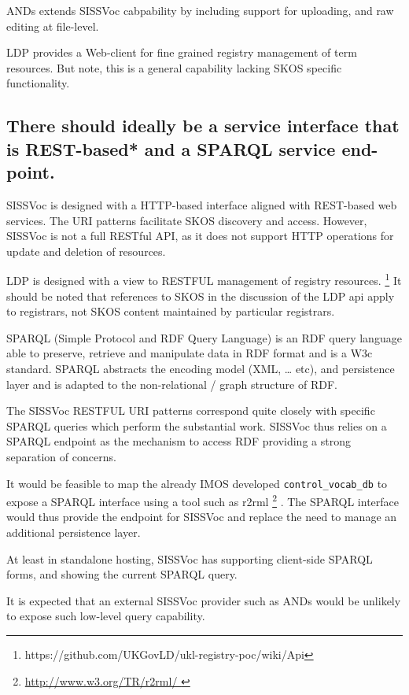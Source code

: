 \documentclass[10pt,a4paper]{article}
\begin{document}
\begin{flushleft}
  ANDs extends SISSVoc cabpability by including support for uploading, and raw editing
  at file-level. 

  LDP provides a Web-client for fine grained registry management of term
resources. But note, this is a general capability lacking SKOS specific functionality.


\subsection{ 
  There should ideally be a service interface that is REST-based* and a SPARQL service end-point.
}

    SISSVoc is designed with a HTTP-based interface aligned with REST-based web
services. The URI patterns facilitate SKOS discovery and access. However,
SISSVoc is not a full RESTful API, as it does not support HTTP operations for
update and deletion of resources.
    
    LDP is designed with a view to RESTFUL management of registry resources.
\footnote { https://github.com/UKGovLD/ukl-registry-poc/wiki/Api } It should be
noted that references to SKOS in the discussion of the LDP api apply to
registrars, not SKOS content maintained by particular registrars.  


    SPARQL (Simple Protocol and RDF Query Language) is an RDF query language
able to preserve, retrieve and manipulate data in RDF format and is a W3c
standard.  SPARQL abstracts the encoding model (XML, … etc), and persistence
layer and is adapted to the non-relational / graph structure of RDF.

    The SISSVoc RESTFUL URI patterns correspond quite closely with specific SPARQL queries
which perform the substantial work. SISSVoc thus relies on a SPARQL endpoint as the
mechanism to access RDF providing a strong separation of concerns.

    It would be feasible to map the already IMOS developed
\texttt{control\_vocab\_db} to expose a SPARQL interface using a tool such as
r2rml \footnote{ \url{ http://www.w3.org/TR/r2rml/ } } .  The SPARQL interface
would thus provide the endpoint for SISSVoc and replace the need to manage an
additional persistence layer.

	At least in standalone hosting, SISSVoc has supporting client-side SPARQL forms, 
	and showing the current SPARQL query.

    It is expected that an external SISSVoc provider such as ANDs would be
unlikely to expose such low-level query capability.
   


\end{flushleft}
\end{document}
